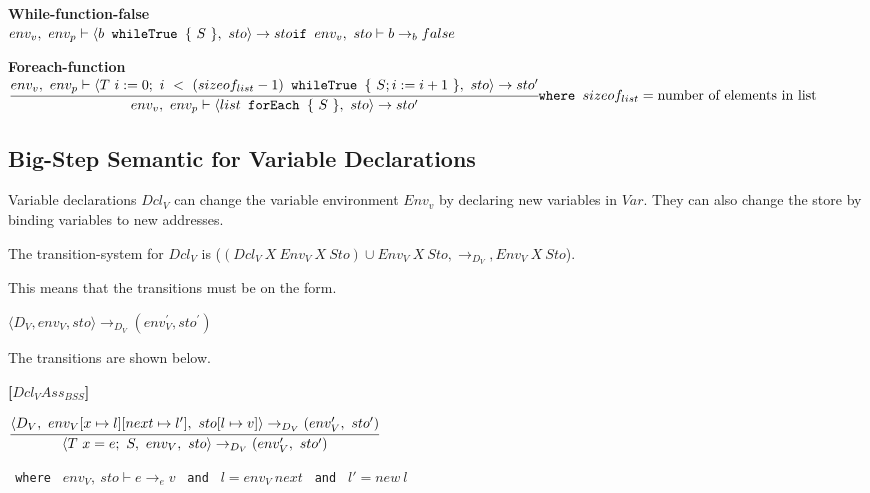 \textbf{While-function-false}\\
\begin{math}
	env_v,\ env_p \vdash \langle b \texttt{ whileTrue } \{\ S\ \},\ sto \rangle \rightarrow sto\\
	\texttt{if } env_v,\ sto \vdash b \rightarrow_b false
\end{math}

\textbf{Foreach-function}\\
\begin{math}
	\cfrac
		{env_v,\ env_p \vdash \langle T\ i := 0;\ i\ <\ (sizeof_{list} - 1) \texttt{ whileTrue } \{\ S;i := i + 1\ \},\ sto \rangle \rightarrow sto'}
		{env_v,\ env_p \vdash \langle list \texttt{ forEach } \{\ S\ \},\ sto \rangle \rightarrow sto'}\\
		\texttt{where } sizeof_{list} = \text{number of elements in list}
\end{math}

















\subsection{Big-Step Semantic for Variable Declarations}
Variable declarations $Dcl_V$ can change the variable environment $Env_v$ by declaring new variables in $Var$.
They can also change the store by binding variables to new addresses.

The transition-system for $Dcl_V$ is ($(Dcl_V\ X\ Env_V\ X\ Sto) \cup Env_V\ X\ Sto, \rightarrow_{D_{V}}, Env_V\ X\ Sto$).

This means that the transitions must be on the form.

\begin{center}
	$\langle D_V,env_V,sto \rangle \rightarrow_{D_V} (env_V^{'} , sto^{'})$
\end{center}

The transitions are shown below.

\textbf{[$Dcl_V Ass_{BSS}$]}\\
\begin{center}
	\begin{math}
	\cfrac
		{\langle D_V,\ env_V[x \mapsto l][next \mapsto l'],\ sto[l \mapsto v] \rangle \rightarrow_{D_V} (env_V',\ sto')}
		{\langle T\ x = e;\ S,\ env_V,\ sto \rangle \rightarrow_{D_V} (env_V',\ sto')}
	\end{math}
	
	\texttt{ where } $env_V,\ sto \vdash e \rightarrow_e v$
	\texttt{ and } $l = env_V\ next$
	\texttt{ and } $l' = new\ l$
\end{center}

